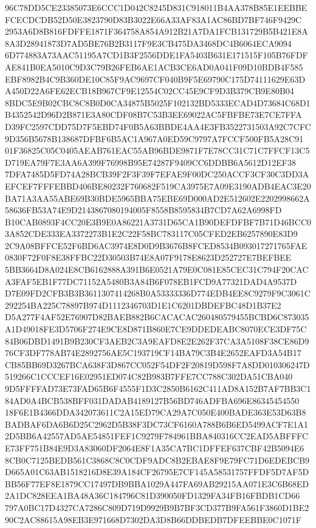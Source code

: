 \documentclass[UTF8,fontset=fandol,zihao=-4,a4paper]{ctexart}
\begin{document}
{{96C78DD5CE23385073E6CCC1D042C8245D831C918011B4AA378B85E1EEBBEFCECDCDB52D50E3823790D83B3022E66A33AF83A1AC86BD7BF746F9429C
2953A6D8B816FDFFE1871F364758A854A912B21A7DA1FCB131729B5B421E8A8A3D28941873D7AD5BE76B2B3117F9E3CB475DA3468DC4B6064ECA9094
6D774883A73AAC51195A7CD1B3F2556DDE1FA5403B631E171515F105B76FDFAE841B0EA5010C9D3C79B26FEB6AE1ACB3CE6AD0A041F09D10BDB4F585
EBF8982B4C9B360DE10C85F9AC9697CF040B9F5E69790C175D74111629E63DA450D22A6FE62ECB18B967CF9E12554C02CC45E9CF9D3B379CB9E80B04
8BDC5E9B02CBC8C8B0D0CA34875B5025F102132BD5333ECAD4D73684C68D1B4352542D96D2B871E3A80CDF08B7C53B3EE69022AC5FBFBE73E7CE7FFA
D39FC2597CDD75D7F5EBD74F0B5A63BBDE4AA4E3FB3522731503A92C7CFC9D356B5678B138687DFBF6B5AC1A967A0ED59C9797A7FCCF500FB5A28C91
01F36825C05C0405AEAB761EAC55AB96BDE9871F7E78CC31C71C7FFCF13C5D719EA79F7E3AA6A399F76998B95E74287F9409CC6DDBB6A5612D12EF38
7DFA7485D5FD74A28BCB39F2F3F39F7EFAE9F00DC250ACCF3CF30C3DD3AEFCEF7FFFEBBD406BE80232F760682F519CA3975E7A09E3190ADB4EAC3E20
BA71A3AA55ABE69B30BDE5965BBA75EBE69D000AD2E512602E2202998662A58636FB53A74E9D2143867080194005F8558B8595834B7CD7A62A6998FD
B10CAB0893F4CC20E3B9E0A86221A3731D65CA1B90DEFDFBF7B71D46BCC03A852CDE333EA3372273B1E2C22F58BC783117C05CFED2EB6257890E83D9
2C9A08BFFCE52F6BD6AC3974E8D0D9B3676B8FCED8534B093017271765FAE0830F72F0F8E38FFBC22D30503B74E8A07F9178E8623D252727E7BEFBEE
5BB3664D8A024E8CB6162888A391B6E0521A79E0C081E85CEC31C794F20CACA3FAF5EB1F77DC71152A5480B3A84B6F078EB1FCD9A77321DAD4A9537D
D7E09FD2CFB3B3B3611307414268B0A53333336D774EDB4EE8C9279F9C3061C292254BA225C78897B974D1112346703D1E1C6201DBDEFBC48D1B37E2
D5A277F4AF52E76907D82BAEB882B6CACACAC260480579455BCBD6C873035A1D49018FE3D5706F274E9CE8D871B860E7CE9DDEDEABC8070ECE3DF75C
84B06DBD1491B9B230CF3AEB2C3A9EAFD8E2E262F37CA3A5108F38CE86D976CF3DF778AB74E2892756AE5C193719CF14BA79C3B4E2652EAFD3A54B17
CB85BB69D3267BCA638F3D867CC052F54DF2F20819D598F7A8DD010306247D519266C1CCCEF16E02951ED074C82B983B7FFE7CC788C302DA51CBA040
9D5FFFFAD73E73FAD65B6F4555F1D3C2850B6162C411AD8A152B7AF7BB3C184AD0A4BCB538BFF031DADAB4189127B56BD746ADFBA696E86345454550
18F6E1B4366DDA342073611C2A15ED79CA29A7C050E400BADE363E53D63B8BADBAF6DA6B6D25C2962D5B38F3DC73CF6160A788B6B6ED5499ACF7E1A1
2D5BB6A42557AD5AE54851FEF1C9279F784961BBA840316CC2EAD5ABFFFCE73FF751B84E9D3A83060DF2064E8F1A35CA7BC1DFFEF637CBF42B5094E6
8CB0C7125BEDB561C3868C8C0CDF9ADC8B2EBAE8F9E79FC71D6EDEBCB9D665A01C63AB1518216D8E39A184CF26795E7CF145A58531757FFDF5D7AF5D
BB56F77EF8E1879CC17497DB9BBA1029A447FA69AB29215AA071E3C6B68ED2A1DC828EEA1BA48A36C184796C81D390050FD1329FA34FB16FBDB1CD66
797A0BC17D4327CA7286C809D719D9929B9B7BF3CD377B9FA561F3860D1BE290C2AC88615A98EB3E971668D7302DA3D8B66DDBEDB7DFEEBBE0C1071F
}}
\end{document}
